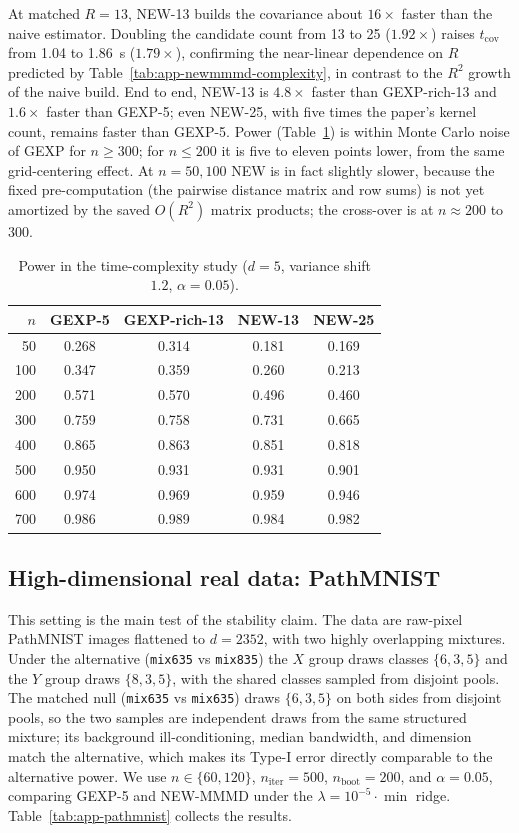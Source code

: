 \documentclass[12pt]{article}
\begin{document}
At matched $R=13$, NEW-13 builds the covariance about $16\times$ faster than the naive estimator. Doubling the candidate count from 13 to 25 ($1.92\times$) raises $t_{\mathrm{cov}}$ from 1.04 to 1.86~s ($1.79\times$), confirming the near-linear dependence on $R$ predicted by Table~\ref{tab:app-newmmmd-complexity}, in contrast to the $R^2$ growth of the naive build. End to end, NEW-13 is $4.8\times$ faster than GEXP-rich-13 and $1.6\times$ faster than GEXP-5; even NEW-25, with five times the paper's kernel count, remains faster than GEXP-5. Power (Table~\ref{tab:app-time-power}) is within Monte Carlo noise of GEXP for $n\ge 300$; for $n\le 200$ it is five to eleven points lower, from the same grid-centering effect. At $n=50,100$ NEW is in fact slightly slower, because the fixed pre-computation (the pairwise distance matrix and row sums) is not yet amortized by the saved $O(R^2)$ matrix products; the cross-over is at $n\approx 200$ to $300$.

\begin{table}[H]
\centering
\caption{Power in the time-complexity study ($d=5$, variance shift $1.2$, $\alpha=0.05$).}
\label{tab:app-time-power}
\scriptsize
\begin{tabular}{rcccc}
\toprule
$n$ & GEXP-5 & GEXP-rich-13 & NEW-13 & NEW-25 \\
\midrule
50  & 0.268 & 0.314 & 0.181 & 0.169 \\
100 & 0.347 & 0.359 & 0.260 & 0.213 \\
200 & 0.571 & 0.570 & 0.496 & 0.460 \\
300 & 0.759 & 0.758 & 0.731 & 0.665 \\
400 & 0.865 & 0.863 & 0.851 & 0.818 \\
500 & 0.950 & 0.931 & 0.931 & 0.901 \\
600 & 0.974 & 0.969 & 0.959 & 0.946 \\
700 & 0.986 & 0.989 & 0.984 & 0.982 \\
\bottomrule
\end{tabular}
\end{table}

\subsection{High-dimensional real data: PathMNIST}

This setting is the main test of the stability claim. The data are raw-pixel PathMNIST images flattened to $d=2352$, with two highly overlapping mixtures. Under the alternative (\texttt{mix635} vs \texttt{mix835}) the $X$ group draws classes $\{6,3,5\}$ and the $Y$ group draws $\{8,3,5\}$, with the shared classes sampled from disjoint pools. The matched null (\texttt{mix635} vs \texttt{mix635}) draws $\{6,3,5\}$ on both sides from disjoint pools, so the two samples are independent draws from the same structured mixture; its background ill-conditioning, median bandwidth, and dimension match the alternative, which makes its Type-I error directly comparable to the alternative power. We use $n\in\{60,120\}$, $n_{\mathrm{iter}}=500$, $n_{\mathrm{boot}}=200$, and $\alpha=0.05$, comparing GEXP-5 and NEW-MMMD under the $\lambda=10^{-5}\cdot\min$ ridge. Table~\ref{tab:app-pathmnist} collects the results.
\end{document}
